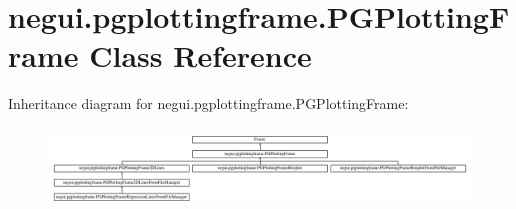 \hypertarget{classnegui_1_1pgplottingframe_1_1PGPlottingFrame}{}\section{negui.\+pgplottingframe.\+P\+G\+Plotting\+Frame Class Reference}
\label{classnegui_1_1pgplottingframe_1_1PGPlottingFrame}
Inheritance diagram for negui.\+pgplottingframe.\+P\+G\+Plotting\+Frame\+:\begin{figure}[H]
\begin{center}
\leavevmode
\includegraphics[height=2.155504cm]{classnegui_1_1pgplottingframe_1_1PGPlottingFrame}
\end{center}
\end{figure}
